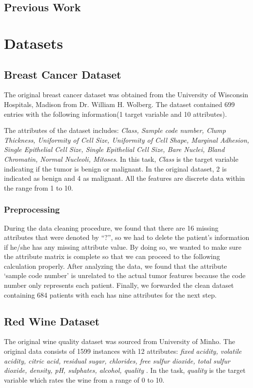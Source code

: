 \documentclass[%
 aip,
 jmp,%
 amsmath,amssymb,
 reprint,%
]{revtex4-1}
\begin{document}
\subsection*{\label{sec:level2}Previous Work}


\section{\label{sec:level1}Datasets}
\subsection*{\label{sec:level2}Breast Cancer Dataset}
The original breast cancer dataset was obtained from the University of Wisconsin Hospitals, Madison from Dr. William H. Wolberg. The dataset contained 699 entries with the following information(1 target variable and 10 attributes). \par

The attributes of the dataset includes: \textit{Class, Sample code number, Clump Thickness, Uniformity of Cell Size, Uniformity of Cell Shape, Marginal Adhesion, Single Epithelial Cell Size, Single Epithelial Cell Size, Bare Nuclei, Bland Chromatin, Normal Nucleoli, Mitoses}. In this task, \textit{Class} is the target variable indicating if the tumor is benign or malignant. In the original dataset, 2 is indicated as benign and 4 as malignant. All the features are discrete data within the range from 1 to 10. 

\subsubsection*{Preprocessing}
During the data cleaning procedure, we found that there are 16 missing attributes that were denoted by “$?$”, so we had to delete the patient’s information if he/she has any missing attribute value. By doing so, we wanted to make sure the attribute matrix is complete so that we can proceed to the following calculation properly. After analyzing the data, we found that the attribute ‘sample code number’ is unrelated to the actual tumor features because the code number only represents each patient. Finally, we forwarded the clean dataset containing 684 patients with each has nine attributes for the next step.

\subsection*{Red Wine Dataset}
The original wine quality dataset was sourced from University of Minho. The original data consists of 1599 instances with 12 attributes: \textit{fixed acidity, volatile acidity, citric acid, residual sugar, chlorides, free sulfur dioxide, total sulfur dioxide, density, pH, sulphates, alcohol, quality
}. In the task, \textit{quality} is the target variable which rates the wine from a range of 0 to 10. 
\end{document}
